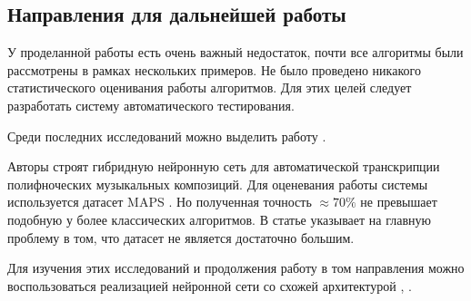 \subsection{Направления для дальнейшей работы}

У проделанной работы есть очень важный недостаток, почти
все алгоритмы были рассмотрены в рамках нескольких примеров.
Не было проведено никакого статистического оценивания работы
алгоритмов. Для этих целей следует разработать систему автоматического
тестирования.

Среди последних исследований можно выделить работу \cite{SBETENN}.

Авторы строят гибридную нейронную сеть для автоматической транскрипции
полифноческих музыкальных композиций. Для оценевания работы системы
используется датасет MAPS \cite{L:MAPS}. Но полученная точность $\approx 70\%$
не превышает подобную у более классических алгоритмов.
В статье указывает на главную проблему в том, что датасет не является
достаточно большим.

Для изучения этих исследований и продолжения работу в том направления
можно воспользоваться реализацией нейронной сети со схожей архитектурой
\cite{KCFGAMT}, \cite{L:auto-music-tagger}.
